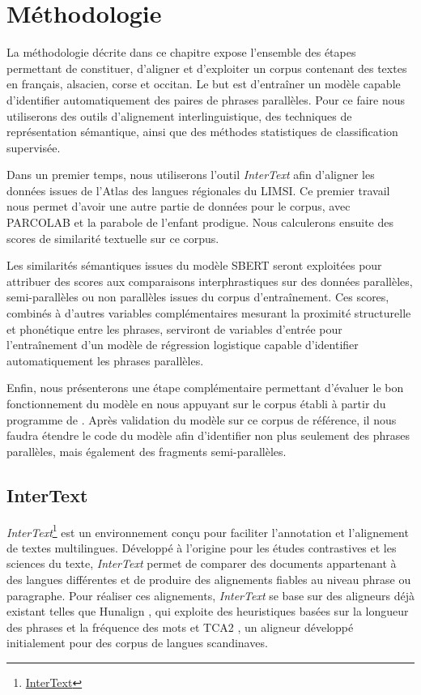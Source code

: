\chapter{Méthodologie}

La méthodologie décrite dans ce chapitre expose l’ensemble des étapes permettant de constituer, d’aligner et
d’exploiter un corpus contenant des textes en français, alsacien, corse et occitan. Le but est d’entraîner
un modèle capable d’identifier automatiquement des
paires de phrases parallèles. Pour ce faire nous utiliserons des outils d’alignement interlinguistique,
des techniques de représentation sémantique, ainsi que des méthodes statistiques de classification supervisée.

Dans un premier temps, nous utiliserons l’outil \textit{InterText} afin d'aligner les données issues de
l’Atlas des langues régionales du LIMSI. Ce premier travail nous permet d'avoir une autre partie de données pour le corpus,
avec PARCOLAB et la parabole de l'enfant prodigue. Nous calculerons ensuite des scores de similarité textuelle
sur ce corpus.

Les similarités sémantiques issues du modèle SBERT seront
exploitées pour attribuer des scores aux comparaisons interphrastiques sur des données parallèles,
semi-parallèles ou non parallèles issues du corpus d'entraînement. Ces scores, combinés à d'autres variables
complémentaires mesurant la proximité structurelle et phonétique entre les phrases,
serviront de variables d'entrée pour l'entraînement d'un modèle de régression logistique capable
d'identifier automatiquement les phrases parallèles.

Enfin, nous présenterons une étape complémentaire permettant d’évaluer le bon fonctionnement du modèle en nous
appuyant sur le corpus établi à partir du programme de \citet{tsolakis_2024}. Après validation du modèle sur ce corpus de
référence, il nous faudra étendre le code du modèle afin d'identifier non plus seulement des phrases
parallèles, mais également des fragments semi-parallèles.

\newpage

\section{InterText}

\textit{InterText}\footnote{\href{https://wanthalf.saga.cz/intertext}{InterText}} \citep{vondricka_2014} est un environnement conçu pour faciliter
l’annotation et l’alignement de textes multilingues. Développé à l’origine pour les études contrastives et les
sciences du texte, \textit{InterText} permet de comparer des documents appartenant à des langues différentes
et de produire des alignements fiables au niveau phrase ou paragraphe. Pour réaliser ces alignements, \textit{InterText}
se base sur des aligneurs déjà existant
telles que Hunalign \citep{nicolov_2007}, qui exploite des heuristiques basées sur la longueur des phrases et la
fréquence des mots et TCA2 \citep{hofland_1996, hofland_1998, Vondricka_2010}, un aligneur développé
initialement pour des corpus de langues scandinaves.

